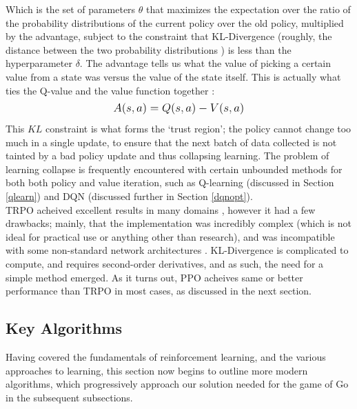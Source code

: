 \documentclass[12pt]{article}
\begin{document}
Which is the set of parameters $\theta$ that maximizes the expectation over the ratio of the probability distributions of the current policy over the old policy, multiplied by the advantage, subject to the constraint that KL-Divergence (roughly, the distance between the two probability distributions \autocite{10.1214/aoms/1177729694}) is less than the hyperparameter $\delta$. The advantage tells us what the value of picking a certain value from a state was versus the value of the state itself. This is actually what ties the Q-value and the value function together \autocite{schulman2015trust}:
\begin{equation}
    \mathlarger{
        A(s,a) = Q(s,a) - V(s,a)
    }
\end{equation}
This $KL$ constraint is what forms the `trust region'; the policy cannot change too much in a single update, to ensure that the next batch of data collected is not tainted by a bad policy update and thus collapsing learning. The problem of learning collapse is frequently encountered with certain unbounded methods for both both policy and value iteration, such as Q-learning (discussed in Section \ref{qlearn}) and DQN (discussed further in Section \ref{dqnopt}).\\\newline
TRPO acheived excellent results in many domains \autocite{schulman2015trust}, however it had a few drawbacks; mainly, that the implementation was incredibly complex (which is not ideal for practical use or anything other than research), and was incompatible with some non-standard network architectures \autocite{schulman2017proximal}. KL-Divergence is complicated to compute, and requires second-order derivatives, and as such, the need for a simple method emerged. As it turns out, PPO acheives same or better performance than TRPO in most cases, as discussed in the next section. 
\subsection{Key Algorithms}
Having covered the fundamentals of reinforcement learning, and the various approaches to learning, this section now begins to outline more modern algorithms, which progressively approach our solution needed for the game of Go in the subsequent subsections.
\end{document}

